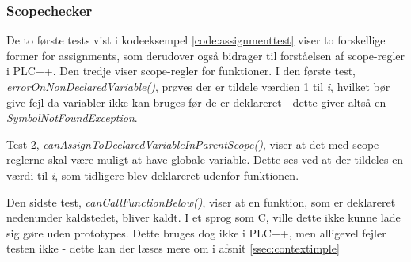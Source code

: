 \subsubsection{Scopechecker}


\noindent De to første tests vist i kodeeksempel \ref{code:assignmenttest} viser to forskellige former for assignments, som derudover også bidrager til forståelsen af scope-regler i PLC++. Den tredje viser scope-regler for funktioner. I den første test, \textit{errorOnNonDeclaredVariable()}, prøves der er tildele værdien 1 til \textit{i}, hvilket bør give fejl da variabler ikke kan bruges før de er deklareret - dette giver altså en \textit{SymbolNotFoundException}.

Test 2, \textit{canAssignToDeclaredVariableInParentScope()}, viser at det med scope-reglerne skal være muligt at have globale variable. Dette ses ved at der tildeles en værdi til \textit{i}, som tidligere blev deklareret udenfor funktionen.

Den sidste test, \textit{canCallFunctionBelow()}, viser at en funktion, som er deklareret nedenunder kaldstedet, bliver kaldt. I et sprog som C, ville dette ikke kunne lade sig gøre uden prototypes. Dette bruges dog ikke i PLC++, men alligevel fejler testen ikke - dette kan der læses mere om i afsnit \ref{ssec:contextimple}